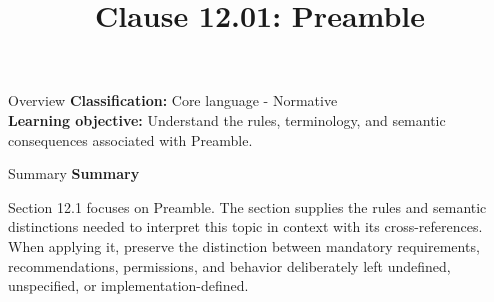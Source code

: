 \documentclass[10pt,letterpaper]{article}
\title{Clause 12.01: Preamble}
\author{}
\date{}
\begin{document}
\maketitle
\begin{CornellOverviewBox}{Overview}
\textbf{Classification:} Core language - Normative\\[2pt]
\textbf{Learning objective:} Understand the rules, terminology, and semantic consequences associated with Preamble.
\end{CornellOverviewBox}\begin{CornellSummaryBox}{Summary}
{\sffamily\bfseries\color{Accent} Summary}\par\vspace{3pt}Section 12.1 focuses on Preamble. The section supplies the rules and semantic distinctions needed to interpret this topic in context with its cross-references. When applying it, preserve the distinction between mandatory requirements, recommendations, permissions, and behavior deliberately left undefined, unspecified, or implementation-defined.
\end{CornellSummaryBox}
\end{document}
